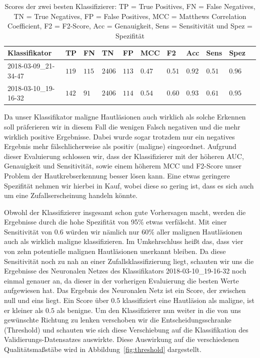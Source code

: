 \begin{table}[htb!]
\begin{center}
\begin{tabular}{lllllllllll}
	\toprule
 	Klassifikator  & TP & FN & TN & FP & MCC & F2 & Acc & Sens & Spez\\
	\midrule
	2018-03-09\_21-34-47 & $119$ &	$115$ &	$2406$ &	$113$ &	$0.47$ &	$0.51$&	$0.92$ &	$0.51$ & $0.96$\\
    2018-03-10\_19-16-32 & $142$&	$91$ &	$2406$ &	$114$ &	$0.54$ 	&$0.60$	&$0.93$	&$0.61$&	$0.95$ \\
 \bottomrule
 \end{tabular}
 \end{center}
  \caption{Scores der zwei besten Klassifizierer: TP = True Positives, FN = False Negatives, TN = True Negatives, FP = False Positives, MCC = Matthews Correlation Coefficient, F2 = F2-Score, Acc = Genauigkeit, Sens = Sensitivität und Spez = Spezifität }
 \label{tab:scores}
 \end{table}
 
 Da unser Klassifikator maligne Hautläsionen auch wirklich als solche Erkennen soll präferieren wir in diesem Fall die wenigen Falsch negativen und die mehr wirklich positive Ergebnisse. Dabei wurde sogar trotzdem nur ein negatives Ergebnis mehr fälschlicherweise als positiv (maligne) eingeordnet. Aufgrund dieser Evaluierung schlossen wir, dass der Klassifizierer mit der höheren AUC, Genauigkeit und Sensitivität, sowie einem  höherem MCC und F2-Score unser Problem der Hautkrebserkennung besser lösen kann. Eine etwas geringere Spezifität nehmen wir hierbei in Kauf, wobei diese so gering ist, dass es sich auch um eine Zufallserscheinung handeln könnte.
 
Obwohl der Klassifizierer insgesamt schon gute Vorhersagen macht, werden die Ergebnisse durch die hohe Spezifität von 95\% etwas verfälscht. Mit einer Sensitivität von $0.6$ würden wir nämlich nur $60\%$ aller malignen Hautläsionen auch als wirklich maligne klassifizieren. Im Umkehrschluss heißt das, dass vier von zehn potentielle malignen Hautläsionen unerkannt bleiben. Da diese Sensitivität noch zu nah an einer Zufallsklassifizierung liegt, schauten wir uns die Ergebnisse des Neuronalen Netzes des Klassifikators 2018-03-10\_19-16-32 noch einmal genauer an, da dieser in der vorherigen Evaluierung die besten Werte aufgewiesen hat. Das Ergebnis des Neuronalen Netz ist ein Score, der zwischen null und eins liegt. Ein Score über $0.5$ klassifiziert eine Hautläsion als maligne, ist er kleiner als $0.5$ als benigne. Um den Klassifizierer nun weiter in die von uns gewünschte Richtung zu lenken verschoben wir die Entscheidungsschranke (Threshold) und schauten wie sich diese Verschiebung auf die Klassifikation des Validierungs-Datensatzes auswirkte. Diese Auswirkung auf die verschiedenen Qualitätsmaßstäbe wird in Abbildung~\ref{fig:threshold} dargestellt. 

